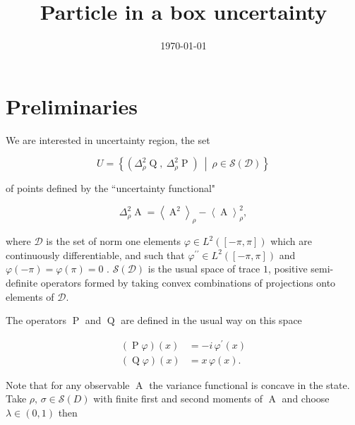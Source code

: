 \documentclass[prb,amsmath,amssymb,notitlepage]{revtex4-1}
\newcommand{\varr}[1]{\Delta^2_\rho #1} %
\newcommand{\expr}[1]{\left\langle #1\right\rangle_\rho} %
\newcommand{\dop}[1]{\mathcal{S}\left(#1\right)}
\DeclareMathOperator{\opa}{A}
\DeclareMathOperator{\opp}{P}
\DeclareMathOperator{\opq}{Q}
\begin{document}
\title{Particle in a box uncertainty}
 
\date{\today}
\begin{abstract}\noindent

\end{abstract}



\maketitle

\section{Preliminaries}
We are interested in uncertainty region, the set 

\begin{equation}
	U = \left\{\left(\varr{\opq},\ \varr{\opp}\right)\ \middle |\ \rho \in \dop{\mathcal{D}}\right\}
\end{equation}

of points defined by the ``uncertainty functional"

\begin{equation}
	\varr{\opa} = \expr{\opa^2} - \expr{\opa}^2,
\end{equation}

where $\mathcal{D}$ is the set of norm one elements $\varphi\in L^2([-\pi,\pi])$ which are continuously differentiable, and such that $\varphi^{\prime\prime}\in L^2([-\pi,\pi])$ and $\varphi(-\pi) = \varphi(\pi) = 0$ \cite{opIntSesq}. $ \dop{\mathcal{D}}$ is the usual space of trace $1$, positive semi-definite operators formed by taking convex combinations of projections onto elements of $\mathcal{D}$.

The operators $\opp$ and $\opq$ are defined in the usual way on this space

\begin{align}
	\left(\opp\varphi\right)(x) &= -i\, \varphi^\prime(x)\\
	\left(\opq\varphi\right)(x) &= x\, \varphi(x).
\end{align}

Note that for any observable $\opa$ the variance functional is concave in the state. Take $\rho,\, \sigma \in \dop{D}$ with finite first and second moments of $\opa$ and choose $\lambda \in (0,1)$ then
\end{document}
